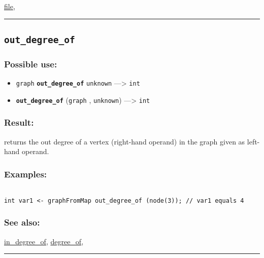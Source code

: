 \documentclass[]{book}
\providecommand{\tightlist}{%
  \setlength{\itemsep}{0pt}\setlength{\parskip}{0pt}}
\theoremstyle{definition}
\theoremstyle{definition}
\theoremstyle{definition}
\theoremstyle{remark}
\begin{document}
\href{OperatorsDH\#file}{file},

\begin{center}\rule{0.5\linewidth}{\linethickness}\end{center}

\subsection{\texorpdfstring{\texttt{out\_degree\_of}}{out\_degree\_of}}\label{out_degree_of}

\subsubsection{Possible use:}\label{possible-use-388}

\begin{itemize}
\tightlist
\item
  \texttt{graph} \textbf{\texttt{out\_degree\_of}} \texttt{unknown}
  ---\textgreater{} \texttt{int}
\item
  \textbf{\texttt{out\_degree\_of}} (\texttt{graph} , \texttt{unknown})
  ---\textgreater{} \texttt{int}
\end{itemize}

\subsubsection{Result:}\label{result-374}

returns the out degree of a vertex (right-hand operand) in the graph
given as left-hand operand.

\subsubsection{Examples:}\label{examples-266}

\begin{verbatim}
 
int var1 <- graphFromMap out_degree_of (node(3)); // var1 equals 4
\end{verbatim}

\subsubsection{See also:}\label{see-also-154}

\href{OperatorsIM\#in_degree_of}{in\_degree\_of},
\href{OperatorsDH\#degree_of}{degree\_of},

\begin{center}\rule{0.5\linewidth}{\linethickness}\end{center}
\end{document}
